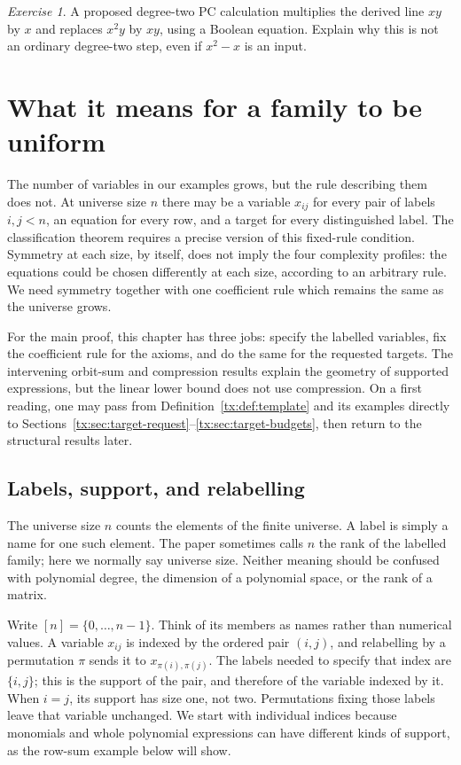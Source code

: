 \documentclass[11pt,a4paper,oneside,openany]{book}
\theoremstyle{definition}\newtheorem{definition}[theorem]{Definition}
\theoremstyle{remark}\newtheorem{remark}[theorem]{Remark}
\newtheorem{exercise}[theorem]{Exercise}
\numberwithin{equation}{chapter}
\begin{document}
\begin{exercise}\label{tx:ex:Boolean-rule}
A proposed degree-two PC calculation multiplies the derived line $xy$
by $x$ and replaces $x^2y$ by $xy$, using a Boolean equation. Explain
why this is not an ordinary degree-two step, even if $x^2-x$ is an input.
\end{exercise}
\par\medskip


\chapter{What it means for a family to be uniform}\label{tx:ch:uniformity}\label{tx:sec:systems}
The number of variables in our examples grows, but the rule describing
them does not. At universe size $n$ there may be a variable $x_{ij}$ for
every pair of labels $i,j<n$, an equation for every row, and a target
for every distinguished label. The classification theorem requires a
precise version of this fixed-rule condition. Symmetry at each size,
by itself, does not imply the four complexity profiles: the equations
could be chosen differently at each size, according to an arbitrary
rule. We need symmetry together with one coefficient rule which remains
the same as the universe grows.

For the main proof, this chapter has three jobs: specify the labelled
variables, fix the coefficient rule for the axioms, and do the same for
the requested targets. The intervening orbit-sum and compression results
explain the geometry of supported expressions, but the linear lower
bound does not use compression. On a first reading, one may pass from
Definition~\ref{tx:def:template} and its examples directly to
Sections~\ref{tx:sec:target-request}--\ref{tx:sec:target-budgets}, then
return to the structural results later.

\section{Labels, support, and relabelling}
The universe size $n$ counts the elements of the finite universe.
A label is simply a name for one such element. The paper sometimes
calls $n$ the rank of the labelled family; here we normally say
universe size. Neither meaning should be confused with polynomial
degree, the dimension of a polynomial space, or the rank of a matrix.

Write $[n]=\{0,\ldots,n-1\}$. Think of its members as names rather
than numerical values. A variable $x_{ij}$ is indexed by the ordered
pair $(i,j)$, and relabelling by a permutation $\pi$ sends it to
$x_{\pi(i),\pi(j)}$. The labels needed to specify that index are
$\{i,j\}$; this is the support of the pair, and therefore of the
variable indexed by it. When $i=j$, its support has size one, not two.
Permutations fixing those labels leave that variable unchanged. We
start with individual indices because monomials and whole polynomial
expressions can have different kinds of support, as the row-sum example
below will show.
\end{document}
